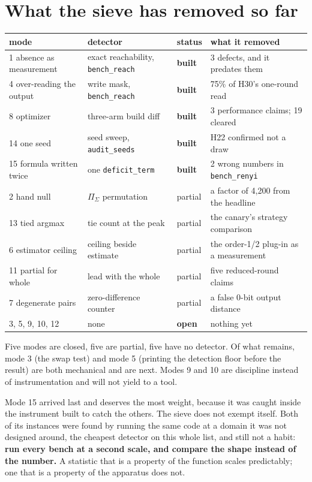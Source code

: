 \section{What the sieve has removed so far}

\begin{center}
\begin{tabular}{@{}llll@{}}
\toprule
mode & detector & status & what it removed \\
\midrule
1 absence as measurement & exact reachability, \texttt{bench\_reach} & \textbf{built} & 3 defects, and it predates them \\
4 over-reading the output & write mask, \texttt{bench\_reach} & \textbf{built} & 75\% of H30's one-round read \\
8 optimizer & three-arm build diff & \textbf{built} & 3 performance claims; 19 cleared \\
14 one seed & seed sweep, \texttt{audit\_seeds} & \textbf{built} & H22 confirmed not a draw \\
15 formula written twice & one \texttt{deficit\_term} & \textbf{built} & 2 wrong numbers in \texttt{bench\_renyi} \\
2 hand null & \(\Pi_\Sigma\) permutation & partial & a factor of 4,200 from the headline \\
13 tied argmax & tie count at the peak & partial & the canary's strategy comparison \\
6 estimator ceiling & ceiling beside estimate & partial & the order-1/2 plug-in as a measurement \\
11 partial for whole & lead with the whole & partial & five reduced-round claims \\
7 degenerate pairs & zero-difference counter & partial & a false 0-bit output distance \\
3, 5, 9, 10, 12 & none & \textbf{open} & nothing yet \\
\bottomrule
\end{tabular}
\end{center}

Five modes are closed, five are partial, five have no detector. Of what remains, mode 3 (the swap test) and mode 5 (printing the detection floor before the result) are both mechanical and are next. Modes 9 and 10 are discipline instead of instrumentation and will not yield to a tool.

Mode 15 arrived last and deserves the most weight, because it was caught inside the instrument built to catch the others. The sieve does not exempt itself. Both of its instances were found by running the same code at a domain it was not designed around, the cheapest detector on this whole list, and still not a habit: \textbf{run every bench at a second scale, and compare the shape instead of the number.} A statistic that is a property of the function scales predictably; one that is a property of the apparatus does not.
